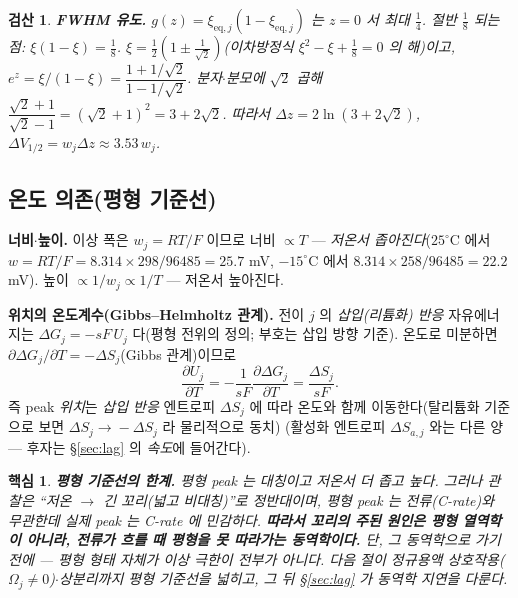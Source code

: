 \documentclass[11pt,a4paper]{article}
\newtheorem*{keybox}{핵심}
\newtheorem*{verifybox}{검산}
\newcommand{\eq}{\mathrm{eq}}
\begin{document}
\begin{verifybox}
\textbf{FWHM 유도.} $g(z)=\xi_{\eq,j}(1-\xi_{\eq,j})$ 는 $z=0$ 서 최대 $\tfrac14$. 절반 $\tfrac18$ 되는 점:
$\xi(1-\xi)=\tfrac18$. $\xi=\tfrac12(1\pm\tfrac1{\sqrt2})$(이차방정식 $\xi^2-\xi+\tfrac18=0$ 의 해)이고,
$e^z=\xi/(1-\xi)=\dfrac{1+1/\sqrt2}{1-1/\sqrt2}$. 분자$\cdot$분모에 $\sqrt2$ 곱해 $\dfrac{\sqrt2+1}{\sqrt2-1}
=(\sqrt2+1)^2=3+2\sqrt2$. 따라서 $\Delta z=2\ln(3+2\sqrt2)$, $\Delta V_{1/2}=w_j\Delta z\approx3.53\,w_j$.
\end{verifybox}

\subsection{온도 의존(평형 기준선)}
\textbf{너비$\cdot$높이.} 이상 폭은 $w_j=RT/F$ 이므로 너비 $\propto T$ — \emph{저온서 좁아진다}($25^\circ$C 에서
$w=RT/F=8.314\times298/96485=25.7$ mV, $-15^\circ$C 에서 $8.314\times258/96485=22.2$ mV). 높이 $\propto1/w_j\propto
1/T$ — 저온서 높아진다.

\textbf{위치의 온도계수(Gibbs--Helmholtz 관계).} 전이 $j$ 의 \emph{삽입(리튬화) 반응} 자유에너지는 $\Delta G_j=-sF\,U_j$
다(평형 전위의 정의; 부호는 삽입 방향 기준). 온도로 미분하면 $\partial\Delta G_j/\partial T=-\Delta S_j$(Gibbs 관계)이므로
\begin{equation}
\frac{\partial U_j}{\partial T}=-\frac{1}{sF}\frac{\partial\Delta G_j}{\partial T}=\frac{\Delta S_j}{sF}.
\label{eq:dUdT}
\end{equation}
즉 peak \emph{위치}는 \emph{삽입 반응} 엔트로피 $\Delta S_j$ 에 따라 온도와 함께 이동한다(탈리튬화 기준으로 보면
$\Delta S_j\!\to\!-\Delta S_j$ 라 물리적으로 동치) \cite{reynier2004}(활성화 엔트로피 $\Delta S_{a,j}$ 와는 다른 양 —
후자는 \S\ref{sec:lag} 의 \emph{속도}에 들어간다).

\begin{keybox}
\textbf{평형 기준선의 한계.} 평형 peak 는 \emph{대칭}이고 저온서 \emph{더 좁고 높다}. 그러나 관찰은
``저온 $\to$ \emph{긴 꼬리}(넓고 비대칭)''로 \emph{정반대}이며, 평형 peak 는 전류(C-rate)와 무관한데 실제 peak
는 C-rate 에 민감하다. \textbf{따라서 꼬리의 주된 원인은 평형 열역학이 아니라, 전류가 흐를 때 평형을 못 따라가는
동역학이다.} 단, 그 동역학으로 가기 전에 — 평형 형태 자체가 \emph{이상 극한이 전부가 아니다}. 다음 절이 정규용액
상호작용($\Omega_j\ne0$)$\cdot$상분리까지 평형 기준선을 넓히고, 그 뒤 \S\ref{sec:lag} 가 동역학 지연을 다룬다.
\end{keybox}

\end{document}

